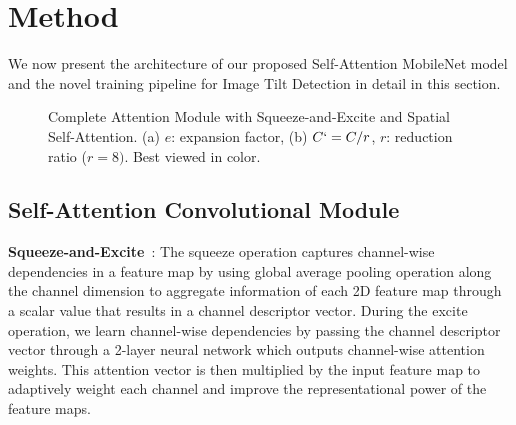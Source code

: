 \documentclass{bmvc2k}
\begin{document}
\section{Method}
\label{sec:method}
We now present the architecture of our proposed Self-Attention MobileNet model and the novel training pipeline for Image Tilt Detection in detail in this section. 
\begin{figure}
\centering
{}
\caption{Complete Attention Module with Squeeze-and-Excite and Spatial Self-Attention. (a) $e$: expansion factor,  (b) $C`=C/r$, $r$: reduction ratio ($r=8)$. Best viewed in color.}
\label{fig:network}
\end{figure}

\subsection{Self-Attention Convolutional Module}
{\bf Squeeze-and-Excite}~\cite{hu2018squeeze}: 
The squeeze operation captures channel-wise dependencies in a feature map by using global average pooling operation along the channel dimension to aggregate information of each 2D feature map through a scalar value that results in a channel descriptor vector. During the excite operation, we learn channel-wise dependencies by passing the channel descriptor vector through a 2-layer neural network which outputs channel-wise attention weights. This attention vector is then multiplied by the input feature map to adaptively weight each channel and improve the representational power of the feature maps. 
\end{document}
